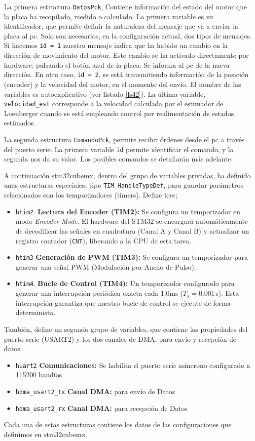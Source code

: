 La primera estructura \texttt{DatosPck}, Contiene información del estado del motor que la placa ha recopilado, medido o calculado. La primera variable es un identificador, que permite definir la naturaleza del mensaje que va a enviar la placa al pc. Solo son necesarios, en la configuración actual, dos tipos de mensajes. Si hacemos \texttt{id = 1} nuestro mensaje indica que ha habido un cambio en la dirección de movimiento del motor. Este cambio se ha activado directamente por hardware: pulsando el botón azul de la placa. Se informa al pc de la nueva dirección. En otro caso, \texttt{id = 2}, se está transmitiendo información de la posición (encoder) y la velocidad del motor, en el momento del envío. El nombre de las variables es autoexplicativo (ver listado \ref{ls42}). La última variable, \texttt{velocidad\_est} corresponde a la velocidad calculada por el estimador de Luenberger cuando se está empleando control por realimentación de estados estimados.

La segunda estructura \texttt{ComandoPck}, permite recibir órdenes desde el pc a través del puerto serie. La primera variable \texttt{id} permite identificar el comando, y la segunda nos da su valor. Los posibles comandos se detallarán más adelante.

A continuación stm32cubemx, dentro del grupo de variables privadas, ha definido unas estructuras especiales, tipo \texttt{TIM\_HandleTypeDef}, para guardar parámetros relacionados con los temporizadores (timers). Define tres; 

\begin{itemize}
	\item \texttt{htim2}. \textbf{Lectura del Encoder (TIM2):} Se configura un temporizador en modo \textit{Encoder Mode}. El hardware del STM32 se encargará automáticamente de decodificar las señales en cuadratura (Canal A y Canal B) y actualizar un registro contador (\texttt{CNT}), liberando a la CPU de esta tarea.
	\item \texttt{htim3} \textbf{Generación de PWM (TIM3):} Se configura un temporizador para generar una señal PWM (Modulación por Ancho de Pulso).
	\item \texttt{htim4}. \textbf{Bucle de Control (TIM4):} Un temporizador configurado para generar una interrupción periódica exacta cada 1.0ms ($T_s = 0.001\,$s). Esta interrupción garantiza que nuestro bucle de control se ejecute de forma determinista.
\end{itemize}
También, define un segundo grupo de variables, que contiene las propiedades del puerto serie (USART2) y los dos canales de DMA, para envío y recepción de datos 
\begin{itemize}
	\item \texttt{huart2} \textbf{Comunicaciones:} Se habilita el puerto serie asíncrono configurado a 115200 baudios 
    \item \texttt{hdma\_usart2\_tx} \textbf{Canal DMA:} para envío de Datos
    \item \texttt{hdma\_usart2\_rx} \textbf{Canal DMA:} para recepción de Datos
\end{itemize}
Cada una de estas estructuras contiene los datos de las configuraciones que definimos en stm32cubemx.

